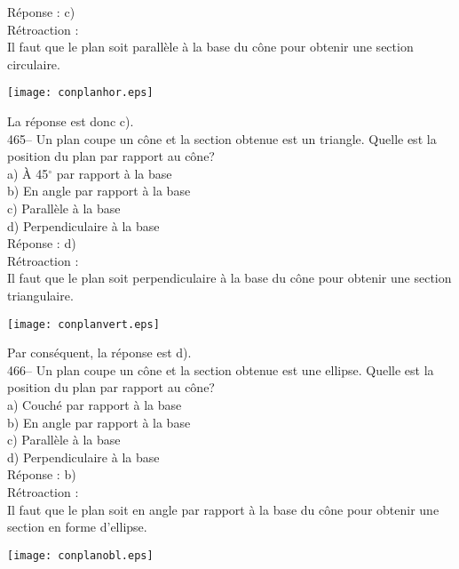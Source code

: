 ﻿\documentclass[letterpaper, 12pt]{article}
\begin{document}
R\'eponse : c)\\

R\'etroaction : \\
Il faut que le plan soit parall\`ele \`a la base du c\^one pour
obtenir une section circulaire.
    \begin{center}
    \texttt{[image: conplanhor.eps]}
    \end{center}

La r\'eponse est donc c).\\

465-- Un plan coupe un c\^one et la section obtenue est un triangle.  Quelle
est la position du plan par rapport au c\^one?\\
a) \`A 45$^{\circ}$ par rapport \`a la base\\
b) En angle par rapport \`a la base\\
c) Parall\`ele \`a la base\\
d) Perpendiculaire \`a la base\\

R\'eponse : d)\\

R\'etroaction : \\
Il faut que le plan soit perpendiculaire \`a la base du c\^one pour
obtenir une section triangulaire.
    \begin{center}
    \texttt{[image: conplanvert.eps]}
    \end{center}

Par cons\'equent, la r\'eponse est d).\\


466-- Un plan coupe un c\^one et la section obtenue est une ellipse.  Quelle
est la position du plan par rapport au c\^one?\\
a) Couch\'e par rapport \`a la base\\
b) En angle par rapport \`a la base\\
c) Parall\`ele \`a la base\\
d) Perpendiculaire \`a la base\\

R\'eponse : b)\\

R\'etroaction : \\
Il faut que le plan soit en angle par rapport \`a la base du c\^one
pour obtenir une section en forme d'ellipse.
    \begin{center}
    \texttt{[image: conplanobl.eps]}
    \end{center}
\end{document}
